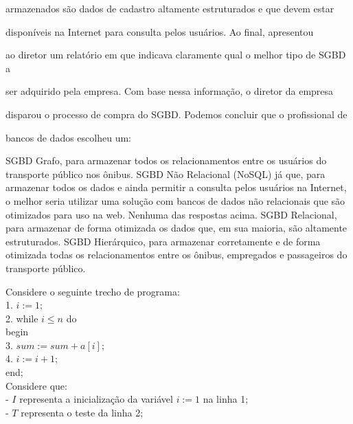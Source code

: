 \documentclass[12pt, addpoints]{exam}
\begin{document}
\begin{questions}
armazenados são dados de cadastro altamente estruturados e que devem estar

disponíveis na Internet para consulta pelos usuários. Ao final, apresentou

ao diretor um relatório em que indicava claramente qual o melhor tipo de SGBD a

ser adquirido pela empresa. Com base nessa informação, o diretor da empresa

disparou o processo de compra do SGBD. Podemos concluir que o profissional de

bancos de dados escolheu um:
\begin{choices}
\choice SGBD Grafo, para armazenar todos os relacionamentos entre os usuários do transporte público nos ônibus.
\choice SGBD Não Relacional (NoSQL) já que, para armazenar todos os dados e ainda permitir a consulta pelos usuários na Internet, o melhor seria utilizar uma solução com bancos de dados não relacionais que são otimizados para uso na web.
\choice Nenhuma das respostas acima.
\choice SGBD Relacional, para armazenar de forma otimizada os dados que, em sua maioria, são altamente estruturados.
\choice SGBD Hierárquico, para armazenar corretamente e de forma otimizada todas os relacionamentos entre os ônibus, empregados e passageiros do transporte público.
\end{choices}

\question

Considere o seguinte trecho de programa:\\

1. \( i := 1; \)\\

2. while \( i \leq n \) do\\

   begin\\

3. \( sum := sum + a[i]; \)\\

4. \( i := i + 1; \)\\

   end;\\



Considere que:\\

- \( I \) representa a inicialização da variável \( i := 1 \) na linha 1;\\

- \( T \) representa o teste da linha 2;\\


\end{questions}
\end{document}
